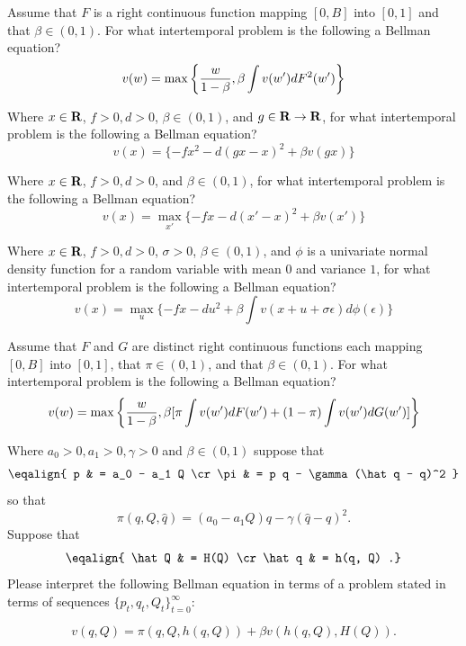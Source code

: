 \medskip



  Assume that  $F$ is a right continuous function mapping $[0, B]$ into $[0,1]$ and that $\beta \in (0,1)$. For what intertemporal problem is the following a Bellman equation?
$$ v(w) = \max\left\{ {w\over{1-\beta}},  \beta \int v(w') d F^2(w') \right\} $$



\medskip
{} Where $x \in {\bf R}$, $f >0, d >0 $,   $\beta \in (0,1)$, and $g \in  {\bf R} \rightarrow {\bf R}$, for what intertemporal problem is the following  a Bellman equation?
$$ v(x) =  \{- f x^2 - d(gx  - x)^2 + \beta v(gx) \} $$


\medskip
{}   Where $x \in {\bf R}$, $f >0, d >0 $, and   $\beta \in (0,1)$, for what intertemporal problem is the following  a Bellman equation?
$$ v(x) = \max_{x'} \{ - f x - d(x' - x)^2 + \beta v(x') \} $$


\medskip
{} Where $x \in {\bf R}$, $f >0, d >0 $, $\sigma >0$,    $\beta \in (0,1)$, and $\phi$ is a univariate normal density function for a random
variable with mean $0$ and variance $1$, for what intertemporal problem is the following  a Bellman equation?
$$ v(x) = \max_{u} \{ - f x - d u^2 + \beta \int v(x +u + \sigma \epsilon) d \phi(\epsilon) \} $$



\medskip



  Assume that  $F$ and $G$ are distinct  right continuous functions each mapping $[0, B]$ into $[0,1]$, that $\pi \in (0,1)$, and  that $\beta \in (0,1)$. For what intertemporal problem is the following a Bellman equation?
$$ v(w) = \max\left\{ {w\over{1-\beta}},  \beta [  \pi \int v(w') d F(w') + (1-\pi) \int v(w') d G(w') ]  \right\} $$


\medskip

 Where $a_0 >0, a_1> 0, \gamma > 0$ and $\beta \in (0,1)$ suppose that
$$\eqalign{ p & = a_0 - a_1 Q \cr
           \pi &  = p q - \gamma(\hat q - q)^2 } $$
so that
$$ \pi(q, Q, \hat q) = (a_0 - a_1 Q)  q - \gamma (\hat q - q)^2 .$$
Suppose that
$$ \eqalign{ \hat Q & = H(Q) \cr
            \hat q & = h(q, Q) .} $$
Please interpret the following Bellman equation in terms of a problem stated in terms of sequences  $\{p_t, q_t, Q_t\}_{t=0}^\infty$:

$$ v(q, Q) = \pi(q,Q, h(q,Q)) + \beta v\left(h(q,Q), H(Q)\right) .$$

